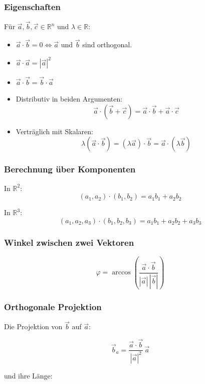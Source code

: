 \subsubsection{Eigenschaften}
Für $\vec a,\vec b,\vec c \in \mathbb{R}^n$ und $\lambda \in \mathbb{R}$:

\begin{itemize}
     \item $\vec a \cdot \vec b = 0 \iff \vec a$ und $\vec b$ sind orthogonal.
     \item $\vec a \cdot \vec a = |\vec a|^2$
     \item $\vec a \cdot \vec b = \vec b \cdot \vec a$
     \item Distributiv in beiden Argumenten:
           \[
                \vec a \cdot (\vec b + \vec c) = \vec a \cdot \vec b + \vec a \cdot \vec c
           \]
     \item Verträglich mit Skalaren:
           \[
                \lambda (\vec a \cdot \vec b) = (\lambda \vec a) \cdot \vec b = \vec a \cdot (\lambda \vec b)
           \]
\end{itemize}

\subsubsection{Berechnung über Komponenten}

In $\mathbb{R}^2$:
\[
     (a_1,a_2)\cdot(b_1,b_2)=a_1b_1+a_2b_2
\]

In $\mathbb{R}^3$:
\[
     (a_1,a_2,a_3)\cdot(b_1,b_2,b_3)=a_1b_1+a_2b_2+a_3b_3
\]

\subsubsection{Winkel zwischen zwei Vektoren}

\[
     \varphi = \arccos\left(\frac{\vec a \cdot \vec b}{|\vec a|\,|\vec b|}\right)
\]

\subsubsection{Orthogonale Projektion}

Die Projektion von $\vec b$ auf $\vec a$:

\[
     \vec b_a = \frac{\vec a \cdot \vec b}{|\vec a|^2}\,\vec a
\]

und ihre Länge:


